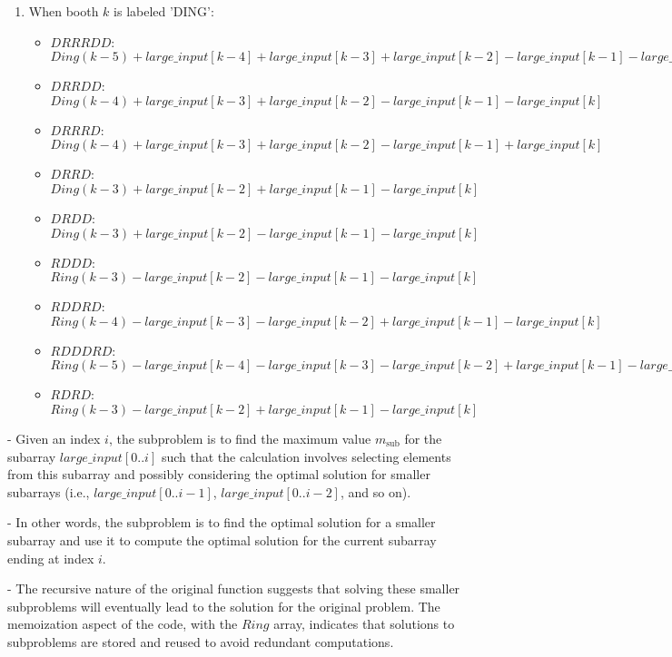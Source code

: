 \documentclass{article}
\begin{document}
\begin{enumerate}
    \item When booth \(k\) is labeled 'DING':
        \begin{itemize}
            \item \(DRRRDD\): \(Ding(k-5) + large\_input[k-4] + large\_input[k-3] + large\_input[k-2] - large\_input[k-1] - large\_input[k]\)
    \item \(DRRDD\): \(Ding(k-4) + large\_input[k-3] + large\_input[k-2] - large\_input[k-1] - large\_input[k]\)
    \item \(DRRRD\): \(Ding(k-4) + large\_input[k-3] + large\_input[k-2] - large\_input[k-1] + large\_input[k]\)
    \item \(DRRD\): \(Ding(k-3) + large\_input[k-2] + large\_input[k-1] - large\_input[k]\)
    \item \(DRDD\): \(Ding(k-3) + large\_input[k-2] - large\_input[k-1] - large\_input[k]\)
    \item \(RDDD\): \(Ring(k-3) - large\_input[k-2] - large\_input[k-1] - large\_input[k]\)
    \item \(RDDRD\): \(Ring(k-4) - large\_input[k-3] - large\_input[k-2] + large\_input[k-1] - large\_input[k]\)
    \item \(RDDDRD\): \(Ring(k-5) -large\_input[k-4] - large\_input[k-3] - large\_input[k-2] + large\_input[k-1] - large\_input[k]\)
    \item \(RDRD\): \(Ring(k-3) - large\_input[k-2] + large\_input[k-1] - large\_input[k]\)
        \end{itemize}
    \end{enumerate}
 - Given an index $i$, the subproblem is to find the maximum value $m_{\text{sub}}$ for the subarray $large\_input[0..i]$ such that    the calculation involves selecting elements from this subarray and possibly considering the optimal solution for smaller subarrays (i.e., $large\_input[0..i-1]$, $large\_input[0..i-2]$, and so on).

 - In other words, the subproblem is to find the optimal solution for a smaller subarray and use it to compute the optimal solution for the current subarray ending at index $i$.

 -  The recursive nature of the original function suggests that solving these smaller subproblems will eventually lead to the solution for the original problem. The memoization aspect of the code, with the $Ring$ array, indicates that solutions to subproblems are stored and reused to avoid redundant computations.
\end{document}

